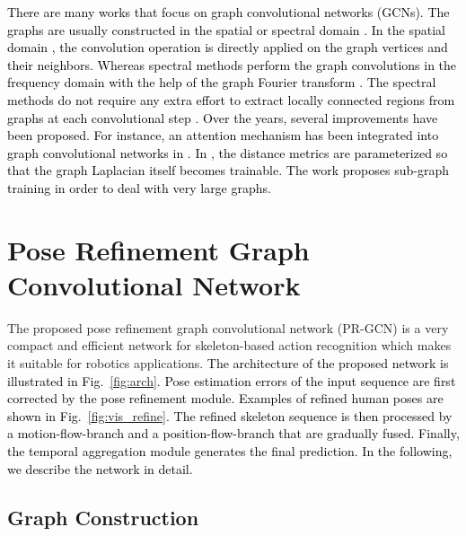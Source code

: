 \documentclass[letterpaper, 10 pt, conference]{ieeeconf}
\newcommand{\todo}[1]{{\textcolor{black}{#1}}}
\begin{document}
\todo{There are many works that focus on graph convolutional networks (GCNs). The graphs are usually constructed in the spatial or spectral domain \cite{shuman2013emerging, bruna2013spectral, henaff2015deep, niepert2016learning, atwood2016diffusion, kipf2017semi, duvenaud2015convolutional, defferrard2016convolutional}.
In the spatial domain \cite{duvenaud2015convolutional, niepert2016learning, hamilton2017inductive, monti2017geometric, kipf2018neural}, the convolution operation is directly applied on the graph vertices and their neighbors.
Whereas spectral methods perform the graph convolutions in the frequency domain with the help of the graph Fourier transform \cite{shuman2013emerging}. The spectral methods do not require any extra effort to extract locally connected regions from graphs at each convolutional step \cite{shuman2013emerging, defferrard2016convolutional, henaff2015deep, kipf2017semi}. Over the years, several improvements have been proposed. For instance, an attention mechanism has been integrated into graph convolutional networks in \cite{velivckovic2017graph}. In \cite{li2018adaptive}, the distance metrics are parameterized  so that the graph Laplacian itself becomes trainable. The work \cite{gao2018large} proposes sub-graph training in order to deal with very large graphs.}




\section{Pose Refinement Graph Convolutional Network}
\label{sec:pr-gcn}
The proposed pose refinement graph convolutional network (PR-GCN) is a very compact and efficient network for skeleton-based action recognition which makes it suitable for robotics applications\cite{liu2020refinedbox,li2020projected}. 
\todo{The architecture of the proposed network is illustrated in Fig.~\ref{fig:arch}. Pose estimation errors of the input sequence are first corrected by the pose refinement module. Examples of refined human poses are shown in Fig.~\ref{fig:vis_refine}. The refined skeleton sequence is then processed by a motion-flow-branch and a position-flow-branch that are gradually fused. Finally, the temporal aggregation module generates the final prediction. In the following, we describe the network in detail.}





\subsection{Graph Construction}
\end{document}
